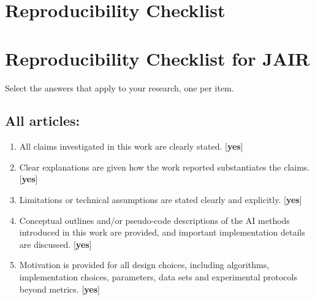 %

\ifarxiv
  \section{Reproducibility Checklist}
\else
  \section{Reproducibility Checklist for JAIR}
\fi
\label{sec:appendix:repro}

Select the answers that apply to your research, one per item.

\subsection*{All articles:}

\begin{enumerate}
    \item All claims investigated in this work are clearly stated.
    [\textbf{yes}]
    \item Clear explanations are given how the work reported substantiates the claims.
    [\textbf{yes}]
    \item Limitations or technical assumptions are stated clearly and explicitly.
    [\textbf{yes}]
    \item Conceptual outlines and/or pseudo-code descriptions of the AI methods introduced in this work are provided, and important implementation details are discussed.
    [\textbf{yes}]
    \item
    Motivation is provided for all design choices, including algorithms, implementation choices, parameters, data sets and experimental protocols beyond metrics.
    [\textbf{yes}]
\end{enumerate}

